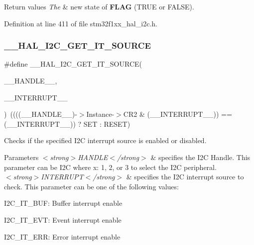 \begin{DoxyRetVals}{Return values}
{\em The} & new state of {\bfseries F\+L\+AG} (T\+R\+UE or F\+A\+L\+SE). \\
\hline
\end{DoxyRetVals}


Definition at line 411 of file stm32f1xx\+\_\+hal\+\_\+i2c.\+h.

\mbox{\label{group___i2_c___exported___macros_ga932024bf4a259e0cdaf9e50b38e3d41a}} 
\subsubsection{\texorpdfstring{\+\_\+\+\_\+\+H\+A\+L\+\_\+\+I2\+C\+\_\+\+G\+E\+T\+\_\+\+I\+T\+\_\+\+S\+O\+U\+R\+CE}{\_\_HAL\_I2C\_GET\_IT\_SOURCE}}
{\footnotesize\ttfamily \#define \+\_\+\+\_\+\+H\+A\+L\+\_\+\+I2\+C\+\_\+\+G\+E\+T\+\_\+\+I\+T\+\_\+\+S\+O\+U\+R\+CE(\begin{DoxyParamCaption}\item[{}]{\+\_\+\+\_\+\+H\+A\+N\+D\+L\+E\+\_\+\+\_\+,  }\item[{}]{\+\_\+\+\_\+\+I\+N\+T\+E\+R\+R\+U\+P\+T\+\_\+\+\_\+ }\end{DoxyParamCaption})~((((\+\_\+\+\_\+\+H\+A\+N\+D\+L\+E\+\_\+\+\_\+)-\/$>$Instance-\/$>$C\+R2 \& (\+\_\+\+\_\+\+I\+N\+T\+E\+R\+R\+U\+P\+T\+\_\+\+\_\+)) == (\+\_\+\+\_\+\+I\+N\+T\+E\+R\+R\+U\+P\+T\+\_\+\+\_\+)) ? S\+ET \+: R\+E\+S\+ET)}



Checks if the specified I2C interrupt source is enabled or disabled. 


\begin{DoxyParams}{Parameters}
{\em $<$strong$>$\+H\+A\+N\+D\+L\+E$<$/strong$>$} & specifies the I2C Handle. This parameter can be I2C where x\+: 1, 2, or 3 to select the I2C peripheral. \\
\hline
{\em $<$strong$>$\+I\+N\+T\+E\+R\+R\+U\+P\+T$<$/strong$>$} & specifies the I2C interrupt source to check. This parameter can be one of the following values\+: \begin{DoxyItemize}
\item I2\+C\+\_\+\+I\+T\+\_\+\+B\+UF\+: Buffer interrupt enable \item I2\+C\+\_\+\+I\+T\+\_\+\+E\+VT\+: Event interrupt enable \item I2\+C\+\_\+\+I\+T\+\_\+\+E\+RR\+: Error interrupt enable \end{DoxyItemize}
\\
\hline
\end{DoxyParams}

